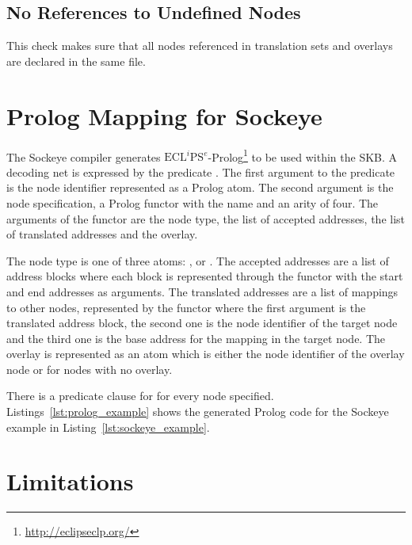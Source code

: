 \documentclass[a4paper,11pt,twoside]{report}
\begin{document}
{{{\section{No References to Undefined Nodes}
This check makes sure that all nodes referenced in translation sets and overlays are declared in the same file.


\chapter{Prolog Mapping for Sockeye}
\label{chap:prolog}
The Sockeye compiler generates \(\text{ECL}^i\text{PS}^e\)-Prolog\footnote{\href{http://eclipseclp.org/}{http://eclipseclp.org/}} to be used within the SKB.
A decoding net is expressed by the predicate . The first argument to the predicate is the node identifier represented as a Prolog atom.
The second argument is the node specification, a Prolog functor with the name  and an arity of four. The arguments of the functor are the node type, the list of accepted addresses, the list of translated addresses and the overlay.

The node type is one of three atoms: ,  or .
The accepted addresses are a list of address blocks where each block is represented through the functor  with the start and end addresses as arguments.
The translated addresses are a list of mappings to other nodes, represented by the functor  where the first argument is the translated address block, the second one is the node identifier of the target node and the third one is the base address for the mapping in the target node.
The overlay is represented as an atom which is either the node identifier of the overlay node or  for nodes with no overlay.

There is a predicate clause for  for every node specified. 
Listings~\ref{lst:prolog_example} shows the generated Prolog code for the Sockeye example in Listing~\ref{lst:sockeye_example}.




\chapter{Limitations}
\label{chap:limitations}
}}}
\end{document}

